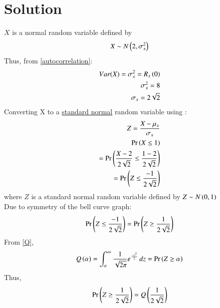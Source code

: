 \documentclass[journal,12pt,twocolumn]{IEEEtran}
\begin{document}
\section{Solution}
$X$ is a normal random variable defined by 
\begin{align}
    X \sim N\left(2 , \sigma_x^2 \right)
\end{align}
Thus, from \eqref{autocorrelation}:
\begin{align}
    Var(X) = \sigma_x^2 = R_x\left(0\right)\\
     \sigma_x^2 = 8\\
     \sigma_x = 2\sqrt{2}
\end{align}
Converting X to a \underline{standard normal} random variable using : 
\begin{align}
   Z = \frac{X - \mu_x}{\sigma_x}\\
    \Pr\left(X\leq 1\right)\\
    = \Pr\left(\frac{X - 2}{2\sqrt{2}} \leq \frac{1-2}{2\sqrt{2}}\right)\\
     = \Pr\left(Z \leq \frac{-1}{2\sqrt{2}}\right)
\end{align}
where $Z$ is a standard normal random variable defined by $Z \sim N\left(0,1\right)$ \\
Due to symmetry of the bell curve graph:
\begin{align}
    \Pr\left(Z\leq \frac{-1}{2\sqrt{2}}\right) = \Pr\left(Z \geq \frac{1}{2\sqrt{2}}\right)
\end{align}
From \eqref{Q},
\begin{align}
    Q\left(\alpha\right) = \int_{\alpha}^{\infty} \frac{1}{\sqrt{2\pi}} e^{\frac{-z^2}{2}}\,dz = \Pr\left(Z \geq \alpha \right)
\end{align}
Thus,
\begin{align}
    \Pr\left(Z \geq \frac{1}{2\sqrt{2}}\right) = Q\left(\frac{1}{2\sqrt{2}}\right)
\end{align}
\end{document}
